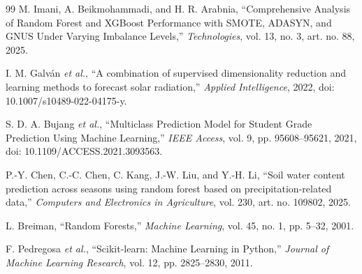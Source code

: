 \begin{thebibliography}{99}
M. Imani, A. Beikmohammadi, and H. R. Arabnia,
``Comprehensive Analysis of Random Forest and XGBoost Performance with SMOTE,
ADASYN, and GNUS Under Varying Imbalance Levels,''
\emph{Technologies}, vol. 13, no. 3, art. no. 88, 2025.

I. M. Galván \emph{et al.},
``A combination of supervised dimensionality reduction and learning methods to
forecast solar radiation,'' \emph{Applied Intelligence}, 2022,
doi: 10.1007/s10489-022-04175-y.

S. D. A. Bujang \emph{et al.},
``Multiclass Prediction Model for Student Grade Prediction Using Machine
Learning,'' \emph{IEEE Access}, vol. 9, pp. 95608--95621, 2021,
doi: 10.1109/ACCESS.2021.3093563.

P.-Y. Chen, C.-C. Chen, C. Kang, J.-W. Liu, and Y.-H. Li,
``Soil water content prediction across seasons using random forest based on
precipitation-related data,'' \emph{Computers and Electronics in Agriculture},
vol. 230, art. no. 109802, 2025.

L. Breiman, ``Random Forests,'' \emph{Machine Learning}, vol. 45, no. 1,
pp. 5--32, 2001.

F. Pedregosa \emph{et al.}, ``Scikit-learn: Machine Learning in Python,''
\emph{Journal of Machine Learning Research}, vol. 12, pp. 2825--2830, 2011.

\end{thebibliography}